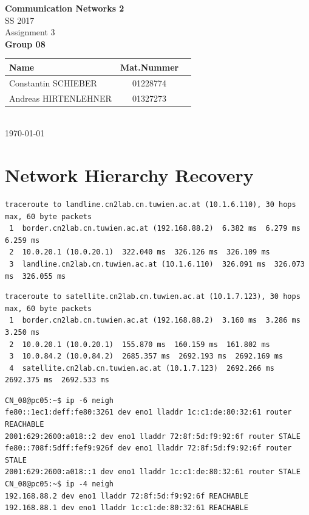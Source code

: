 \documentclass[parskip=full]{scrartcl}
\begin{document}
\begin{titlepage}
    \centering
    \vspace*{2cm}
    {\Huge \textbf{Communication Networks 2}}\\
    SS 2017\\
    \vspace*{1cm}
    {\Large Assignment 3}
    \\\vspace*{3cm}
    {\Large \textbf{Group 08}}\\
    \vspace*{1cm}
    {\large 
        \begin{tabular}{l c c}
            Name & Mat.Nummer \\ \hline
            Constantin SCHIEBER & 01228774 \\
            Andreas HIRTENLEHNER & 01327273
        \end{tabular}
    }
    \\\vspace*{7cm}
    \today
\end{titlepage}

\section{Network Hierarchy Recovery}

\begin{verbatim}
traceroute to landline.cn2lab.cn.tuwien.ac.at (10.1.6.110), 30 hops max, 60 byte packets
 1  border.cn2lab.cn.tuwien.ac.at (192.168.88.2)  6.382 ms  6.279 ms  6.259 ms
 2  10.0.20.1 (10.0.20.1)  322.040 ms  326.126 ms  326.109 ms
 3  landline.cn2lab.cn.tuwien.ac.at (10.1.6.110)  326.091 ms  326.073 ms  326.055 ms
\end{verbatim}

\begin{verbatim}
traceroute to satellite.cn2lab.cn.tuwien.ac.at (10.1.7.123), 30 hops max, 60 byte packets
 1  border.cn2lab.cn.tuwien.ac.at (192.168.88.2)  3.160 ms  3.286 ms  3.250 ms
 2  10.0.20.1 (10.0.20.1)  155.870 ms  160.159 ms  161.802 ms
 3  10.0.84.2 (10.0.84.2)  2685.357 ms  2692.193 ms  2692.169 ms
 4  satellite.cn2lab.cn.tuwien.ac.at (10.1.7.123)  2692.266 ms  2692.375 ms  2692.533 ms
\end{verbatim}

\begin{verbatim}
CN_08@pc05:~$ ip -6 neigh
fe80::1ec1:deff:fe80:3261 dev eno1 lladdr 1c:c1:de:80:32:61 router REACHABLE
2001:629:2600:a018::2 dev eno1 lladdr 72:8f:5d:f9:92:6f router STALE
fe80::708f:5dff:fef9:926f dev eno1 lladdr 72:8f:5d:f9:92:6f router STALE
2001:629:2600:a018::1 dev eno1 lladdr 1c:c1:de:80:32:61 router STALE
CN_08@pc05:~$ ip -4 neigh
192.168.88.2 dev eno1 lladdr 72:8f:5d:f9:92:6f REACHABLE
192.168.88.1 dev eno1 lladdr 1c:c1:de:80:32:61 REACHABLE
\end{verbatim}
\end{document}
